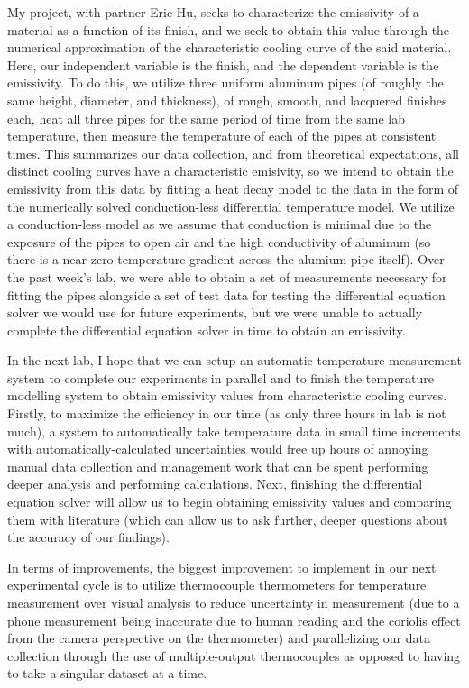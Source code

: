\documentclass[12pt]{article}
\begin{document}
My project, with partner Eric Hu, seeks to characterize the emissivity of a material as a function of its finish, and we seek to obtain this value through the numerical approximation of the characteristic cooling curve of the said material. Here, our independent variable is the finish, and the dependent variable is the emissivity. To do this, we utilize three uniform aluminum pipes (of roughly the same height, diameter, and thickness), of rough, smooth, and lacquered finishes each, heat all three pipes for the same period of time from the same lab temperature, then measure the temperature of each of the pipes at consistent times. This summarizes our data collection, and from theoretical expectations, all distinct cooling curves have a characteristic emisivity, so we intend to obtain the emissivity from this data by fitting a heat decay model to the data in the form of the numerically solved conduction-less differential temperature model. We utilize a conduction-less model as we assume that conduction is minimal due to the exposure of the pipes to open air and the high conductivity of aluminum (so there is a near-zero temperature gradient across the alumium pipe itself). Over the past week's lab, we were able to obtain a set of measurements necessary for fitting the pipes alongside a set of test data for testing the differential equation solver we would use for future experiments, but we were unable to actually complete the differential equation solver in time to obtain an emissivity.

In the next lab, I hope that we can setup an automatic temperature measurement system to complete our experiments in parallel and to finish the temperature modelling system to obtain emissivity values from characteristic cooling curves. Firstly, to maximize the efficiency in our time (as only three hours in lab is not much), a system to automatically take temperature data in small time increments with automatically-calculated uncertainties would free up hours of annoying manual data collection and management work that can be spent performing deeper analysis and performing calculations. Next, finishing the differential equation solver will allow us to begin obtaining emissivity values and comparing them with literature (which can allow us to ask further, deeper questions about the accuracy of our findings).

In terms of improvements, the biggest improvement to implement in our next experimental cycle is to utilize thermocouple thermometers for temperature measurement over visual analysis to reduce uncertainty in measurement (due to a phone measurement being inaccurate due to human reading and the coriolis effect from the camera perspective on the thermometer) and parallelizing our data collection through the use of multiple-output thermocouples as opposed to having to take a singular dataset at a time. 
\end{document}
